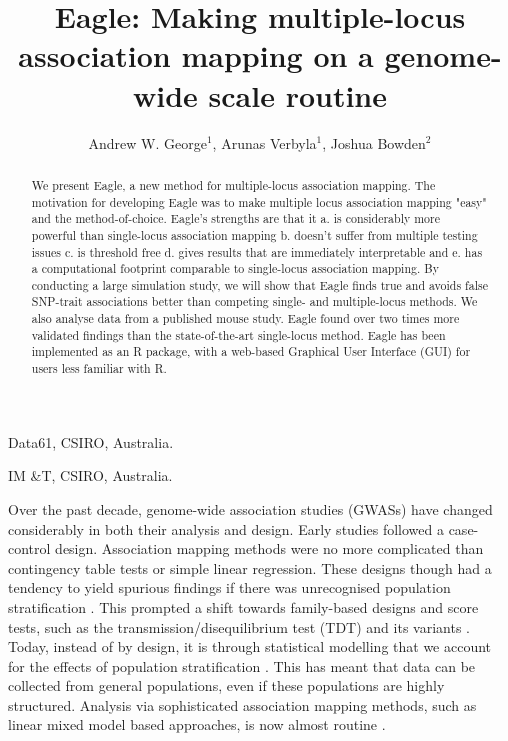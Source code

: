 \documentclass{nature}
\begin{document}
\title{Eagle: Making multiple-locus association mapping on a genome-wide scale routine}
\author{Andrew W. George$^1$, Arunas Verbyla$^1$, Joshua Bowden$^2$}

\maketitle


\newcommand{\bwidetildea}{\widetilde{\bm{a}}}
\newcommand{\bu}{\bm{u}}
\newcommand{\be}{\bm{e}}
\newcommand{\btau}{\bm{\tau}}
\newcommand{\ba}{\bm{a}}
\newcommand{\bzero}{\bm{0}}
\newcommand{\bI}{\bm{I}}
\newcommand{\bX}{\bm{X}}
\newcommand{\by}{\bm{y}}
\newcommand{\bZ}{\bm{Z}}
\newcommand{\bM}{\bm{M}}
\newcommand{\bmm}{\bm{m}}


\begin{affiliations}
\item Data61, CSIRO, Australia.
\item IM \&T, CSIRO, Australia.
\end{affiliations}

\begin{abstract}
We present Eagle, a new method for multiple-locus association mapping. The
motivation for developing Eagle was to make multiple locus association mapping "easy" and the method-of-choice. 
Eagle's strengths are that it a. is considerably more powerful than single-locus association mapping b. doesn't suffer from multiple testing issues c. is threshold free d. gives results that are immediately interpretable and e. has a computational footprint comparable to single-locus association mapping. 
By conducting a large simulation study, we will show that Eagle finds true and avoids false SNP-trait associations better than competing single- and 
multiple-locus methods. We also analyse data from a published mouse study. Eagle found over two times more validated findings than the state-of-the-art 
single-locus method. 
Eagle has been implemented as an R package, with a web-based Graphical User Interface (GUI) for users less familiar with R.
\end{abstract}


Over the past decade,  genome-wide association studies (GWASs) have changed considerably in both their analysis and design. Early studies
 followed a case-control design. Association mapping methods were no more complicated than contingency table tests or simple 
linear regression. These designs though had a tendency to yield spurious findings if there was unrecognised population stratification 
\cite{cardon2003population}. This prompted a shift towards family-based designs and score tests, such as the transmission/disequilibrium test (TDT)  and its variants \cite{spielman1996tdt}. Today, instead of by design, it is through statistical modelling that we account for the effects of population stratification \cite{price2010new}. This has meant that data can be collected from general populations, even if these populations are highly structured. Analysis via sophisticated association mapping methods, such as linear mixed model based approaches,  is now almost routine \cite{purcell2007plink, bradbury2007tassel}.
\end{document}
